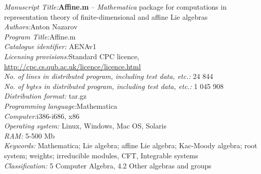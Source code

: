 \documentclass[preprint,12pt]{elsarticle}
\newcounter{bla}
\begin{document}
\begin{small}
\noindent
{\em Manuscript Title:}{\bf Affine.m} -- {\it Mathematica} package for computations in representation theory of finite-dimensional and affine Lie algebras                                       \\
{\em Authors:}Anton Nazarov                                                \\
{\em Program Title:}Affine.m                                          \\
{\em Catalogue identifier:}  AENA\textunderscore v1                                 \\
{\em Licensing provisions:}Standard CPC licence, \url{http://cpc.cs.qub.ac.uk/licence/licence.html}                                   \\
{\em No. of lines in distributed program, including test data, etc.:} 24 844\\ 
{\em No. of bytes in distributed program, including test data, etc.:} 1 045 908\\
{\em Distribution format:} tar.gz\\
{\em Programming language:}Mathematica                                   \\
{\em Computer:}i386-i686, x86                                               \\
{\em Operating system:} Linux, Windows, Mac OS, Solaris                                       \\
{\em RAM:} 5-500 Mb                                              \\
{\em Keywords:} Mathematica; Lie algebra; affine Lie algebra; Kac-Moody algebra; root system; weights; irreducible modules, CFT, Integrable systems\\
{\em Classification:} 5 Computer Algebra, 4.2 Other algebras and groups                                         \\

\end{small}
\end{document}
